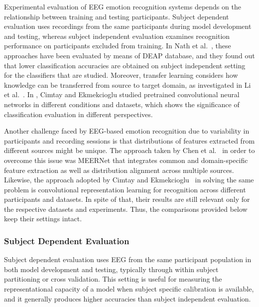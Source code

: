 \documentclass[ASNA,twocolumn]{USG}
\begin{document}
Experimental evaluation of EEG emotion recognition systems depends on the relationship between training and testing participants. Subject dependent evaluation uses recordings from the same participants during model development and testing, whereas subject independent evaluation examines recognition performance on participants excluded from training. In Nath et al.~\cite{nath2020comparative}, these approaches have been evaluated by means of DEAP database, and they found out that lower classification accuracies are obtained on subject independent setting for the classifiers that are studied. Moreover, transfer learning considers how knowledge can be transferred from source to target domain, as investigated in Li et al.~\cite{li2022cross}. In \cite{cimtay2020investigating}, Cimtay and Ekmekcioglu studied pretrained convolutional neural networks in different conditions and datasets, which shows the significance of classification evaluation in different perspectives.

Another challenge faced by EEG-based emotion recognition due to variability in participants and recording sessions is that distributions of features extracted from different sources might be unique. The approach taken by Chen et al.~\cite{chen2021meernet} in order to overcome this issue was MEERNet that integrates common and domain-specific feature extraction as well as distribution alignment across multiple sources. Likewise, the approach adopted by Cimtay and Ekmekcioglu~\cite{cimtay2020investigating} in solving the same problem is convolutional representation learning for recognition across different participants and datasets. In spite of that, their results are still relevant only for the respective datasets and experiments. Thus, the comparisons provided below keep their settings intact.


\subsubsection{Subject Dependent Evaluation}
\label{subsubsec:subject_dependent_evaluation}

Subject dependent evaluation uses EEG from the same participant population in both model development and testing, typically through within subject partitioning or cross validation. This setting is useful for measuring the representational capacity of a model when subject specific calibration is available, and it generally produces higher accuracies than subject independent evaluation. 
\end{document}
